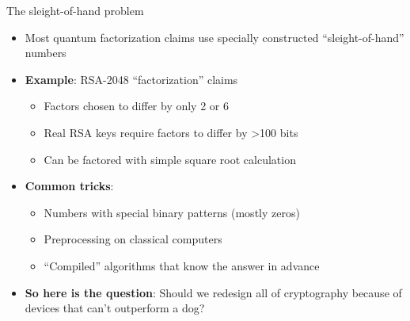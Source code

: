 \ifdefined\PRESENTATION\else\PassOptionsToClass{handout}{beamer}\fi\documentclass[aspectratio=169, lualatex]{beamer}
\begin{document}
\begin{frame}{The sleight-of-hand problem}
	\begin{itemize}
		\item Most quantum factorization claims use specially constructed ``sleight-of-hand'' numbers
		\item \textbf{Example}: RSA-2048 ``factorization'' claims
		      \begin{itemize}
			      \item Factors chosen to differ by only 2 or 6
			      \item Real RSA keys require factors to differ by >100 bits
			      \item Can be factored with simple square root calculation
		      \end{itemize}
		\item \textbf{Common tricks}:
		      \begin{itemize}
			      \item Numbers with special binary patterns (mostly zeros)
			      \item Preprocessing on classical computers
			      \item ``Compiled'' algorithms that know the answer in advance
		      \end{itemize}
		\item \textbf{So here is the question}: Should we redesign all of cryptography because of devices that can't outperform a dog?
	\end{itemize}
\end{frame}
\end{document}

